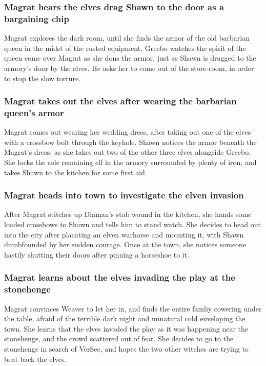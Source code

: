 \subsubsection{\Gls{Magrat} hears the elves drag \Gls{Shawn} to the door as a bargaining chip}
\Gls{Magrat} explores the dark room, until she finds the armor of the old barbarian queen in the
midst of the rusted equipment. \Gls{Greebo} watches the spirit of the queen come over \Gls{Magrat}
as she dons the armor, just as \Gls{Shawn} is dragged to the armory's door by the elves. He asks
her to come out of the store-room, in order to stop the slow torture.

\subsubsection{\Gls{Magrat} takes out the elves after wearing the barbarian queen's armor}
\Gls{Magrat} comes out wearing her wedding dress, after taking out one of the elves with a crossbow
bolt through the keyhole. \Gls{Shawn} notices the armor beneath the \Gls{Magrat}'s dress, as she
takes out two of the other three elves alongside \Gls{Greebo}. She locks the sole remaining elf in
the armory surrounded by plenty of iron, and takes \Gls{Shawn} to the kitchen for some first aid.

\subsubsection{\Gls{Magrat} heads into town to investigate the elven invasion}
After \Gls{Magrat} stitches up \Gls{Diaman}'s stab wound in the kitchen, she hands some loaded
crossbows to \Gls{Shawn} and tells him to stand watch. She decides to head out into the city after
placating an elven warhorse and mounting it, with \Gls{Shawn} dumbfounded by her sudden courage.
Once at the town, she notices someone hastily shutting their doors after pinning a horseshoe to it.

\subsubsection{\Gls{Magrat} learns about the elves invading the play at the stonehenge}
\Gls{Magrat} convinces \Gls{Weaver} to let her in, and finds the entire famliy cowering under the
table, afraid of the terrible dark night and unnatural cold enveloping the town. She learns that
the elves invaded the play as it was happening near the stonehenge, and the crowd scattered out of
fear. She decides to go to the stonehenge in search of \Gls{VerSec}, and hopes the two other
witches are trying to beat back the elves.

